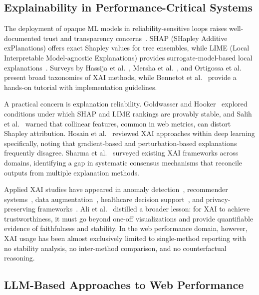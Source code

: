 \documentclass[sn-nature]{sn-jnl}
\begin{document}
\subsection{Explainability in Performance-Critical Systems}

The deployment of opaque ML models in reliability-sensitive loops raises well-documented trust and transparency concerns~\cite{goyal2025, ali2023}. SHAP (SHapley Additive exPlanations) offers exact Shapley values for tree ensembles, while LIME (Local Interpretable Model-agnostic Explanations) provides surrogate-model-based local explanations~\cite{salih2024, hassija2024, ortigossa2024}. Surveys by Hassija et al.~\cite{hassija2024}, Mersha et al.~\cite{mersha2024}, and Ortigossa et al.~\cite{ortigossa2024} present broad taxonomies of XAI methods, while Bennetot et al.~\cite{bennetot2024} provide a hands-on tutorial with implementation guidelines.

A practical concern is explanation reliability. Goldwasser and Hooker~\cite{goldwasser2024} explored conditions under which SHAP and LIME rankings are provably stable, and Salih et al.~\cite{salih2024} warned that collinear features, common in web metrics, can distort Shapley attribution. Hosain et al.~\cite{hosain2024} reviewed XAI approaches within deep learning specifically, noting that gradient-based and perturbation-based explanations frequently disagree. Sharma et al.~\cite{zhou2024} surveyed existing XAI frameworks across domains, identifying a gap in systematic consensus mechanisms that reconcile outputs from multiple explanation methods.

Applied XAI studies have appeared in anomaly detection~\cite{alam2024}, recommender systems~\cite{benleulmi2025, rahim2025}, data augmentation~\cite{mersha2025}, healthcare decision support~\cite{yang2025}, and privacy-preserving frameworks~\cite{bhardwaj2025}. Ali et al.~\cite{ali2023} distilled a broader lesson: for XAI to achieve trustworthiness, it must go beyond one-off visualizations and provide quantifiable evidence of faithfulness and stability. In the web performance domain, however, XAI usage has been almost exclusively limited to single-method reporting with no stability analysis, no inter-method comparison, and no counterfactual reasoning.

\subsection{LLM-Based Approaches to Web Performance}
\end{document}

